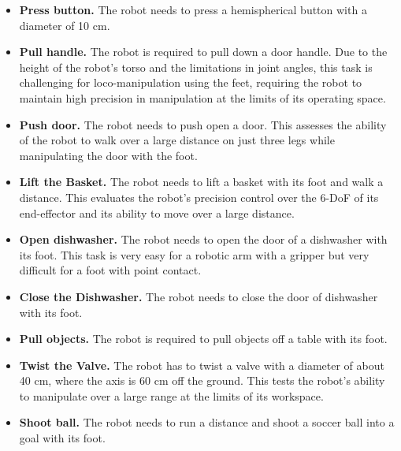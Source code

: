 \begin{itemize}
    \item \textbf{Press button.} The robot needs to press a hemispherical button with a diameter of 10 cm.
    \item \textbf{Pull handle.} The robot is required to pull down a door handle. Due to the height of the robot's torso and the limitations in joint angles, this task is challenging for loco-manipulation using the feet, requiring the robot to maintain high precision in manipulation at the limits of its operating space.
    \item \textbf{Push door.} The robot needs to push open a door. This assesses the ability of the robot to walk over a large distance on just three legs while manipulating the door with the foot.
    \item \textbf{Lift the Basket.} The robot needs to lift a basket with its foot and walk a distance. This evaluates the robot's precision control over the 6-DoF of its end-effector and its ability to move over a large distance.
    \item \textbf{Open dishwasher.} The robot needs to open the door of a dishwasher with its foot. This task is very easy for a robotic arm with a gripper but very difficult for a foot with point contact. 
    \item \textbf{Close the Dishwasher.} The robot needs to close the door of dishwasher with its foot.
    \item \textbf{Pull objects.} The robot is required to pull objects off a table with its foot.
    \item \textbf{Twist the Valve.} The robot has to twist a valve with a diameter of about 40 cm, where the axis is 60 cm off the ground. This tests the robot's ability to manipulate over a large range at the limits of its workspace.
    \item \textbf{Shoot ball.} The robot needs to run a distance and shoot a soccer ball into a goal with its foot.
\end{itemize}